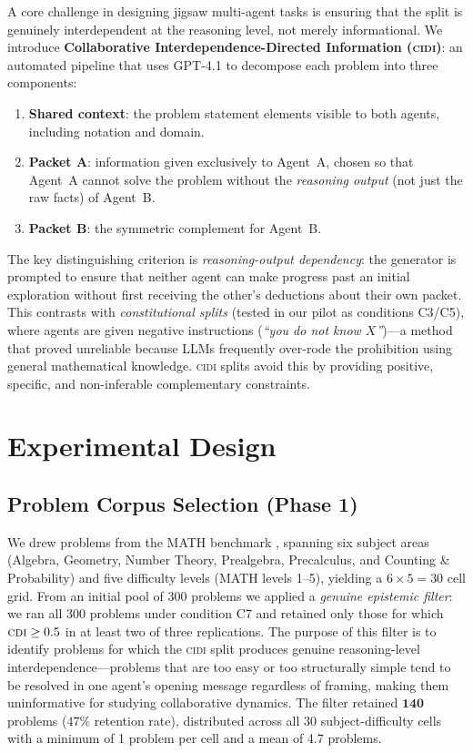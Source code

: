 \documentclass{article}
\newcommand{\CDI}{\textsc{cdi}}
\newcommand{\CIDI}{\textsc{cidi}}
\begin{document}
A core challenge in designing jigsaw multi-agent tasks is ensuring
that the split is genuinely interdependent at the reasoning level,
not merely informational. We introduce \textbf{Collaborative
Interdependence-Directed Information (\CIDI)}: an automated pipeline
that uses GPT-4.1 to decompose each problem into three components:

\begin{enumerate}
  \item \textbf{Shared context}: the problem statement elements visible
  to both agents, including notation and domain.
  \item \textbf{Packet A}: information given exclusively to Agent~A,
  chosen so that Agent~A cannot solve the problem without the
  \emph{reasoning output} (not just the raw facts) of Agent~B.
  \item \textbf{Packet B}: the symmetric complement for Agent~B.
\end{enumerate}

The key distinguishing criterion is \emph{reasoning-output
dependency}: the generator is prompted to ensure that neither agent
can make progress past an initial exploration without first receiving
the other's deductions about their own packet. This contrasts with
\emph{constitutional splits} (tested in our pilot as conditions
C3/C5), where agents are given negative instructions (\textit{``you
do not know $X$''})---a method that proved unreliable because LLMs
frequently over-rode the prohibition using general mathematical
knowledge. \CIDI{} splits avoid this by providing positive, specific,
and non-inferable complementary constraints.

\section{Experimental Design}
\label{sec:design}

\subsection{Problem Corpus Selection (Phase 1)}

We drew problems from the MATH benchmark \citep{hendrycks2021math},
spanning six subject areas (Algebra, Geometry, Number Theory,
Prealgebra, Precalculus, and Counting \& Probability) and five
difficulty levels (MATH levels 1--5), yielding a $6 \times 5 = 30$
cell grid. From an initial pool of 300 problems we applied a
\emph{genuine epistemic filter}: we ran all 300 problems under
condition C7 and retained only those for which $\CDI \geq 0.5$ in at
least two of three replications. The purpose of this filter is to
identify problems for which the \CIDI{} split produces genuine
reasoning-level interdependence---problems that are too easy or too
structurally simple tend to be resolved in one agent's opening message
regardless of framing, making them uninformative for studying
collaborative dynamics. The filter retained $\mathbf{140}$ problems
($47\%$ retention rate), distributed across all 30 subject-difficulty
cells with a minimum of 1 problem per cell and a mean of 4.7 problems.
\end{document}
